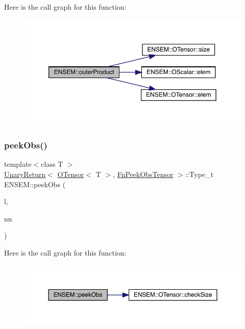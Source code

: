 Here is the call graph for this function\+:\nopagebreak
\begin{figure}[H]
\begin{center}
\leavevmode
\includegraphics[width=350pt]{de/d87/group__obstensor_ga4b391fbdb7626ccda42a2068c3ff5ba2_cgraph}
\end{center}
\end{figure}
\mbox{\label{group__obstensor_ga527c1440845b0963c06ccade99d69bf4}} 
\subsubsection{\texorpdfstring{peekObs()}{peekObs()}\hspace{0.1cm}{\footnotesize\ttfamily [1/2]}}
{\footnotesize\ttfamily template$<$class T $>$ \\
\mbox{\hyperlink{structENSEM_1_1UnaryReturn}{Unary\+Return}}$<$ \mbox{\hyperlink{classENSEM_1_1OTensor}{O\+Tensor}}$<$ T $>$, \mbox{\hyperlink{structENSEM_1_1FnPeekObsTensor}{Fn\+Peek\+Obs\+Tensor}} $>$\+::Type\+\_\+t E\+N\+S\+E\+M\+::peek\+Obs (\begin{DoxyParamCaption}\item[{const \mbox{\hyperlink{classENSEM_1_1OTensor}{O\+Tensor}}$<$ T $>$ \&}]{l,  }\item[{const \mbox{\hyperlink{classXMLArray_1_1Array}{Array}}$<$ int $>$ \&}]{nn }\end{DoxyParamCaption})\hspace{0.3cm}{\ttfamily [inline]}}

Here is the call graph for this function\+:\nopagebreak
\begin{figure}[H]
\begin{center}
\leavevmode
\includegraphics[width=350pt]{de/d87/group__obstensor_ga527c1440845b0963c06ccade99d69bf4_cgraph}
\end{center}
\end{figure}
\mbox{\label{group__obstensor_ga9fffee5b1bebf7fa7202b9b11ac11b16}} 
